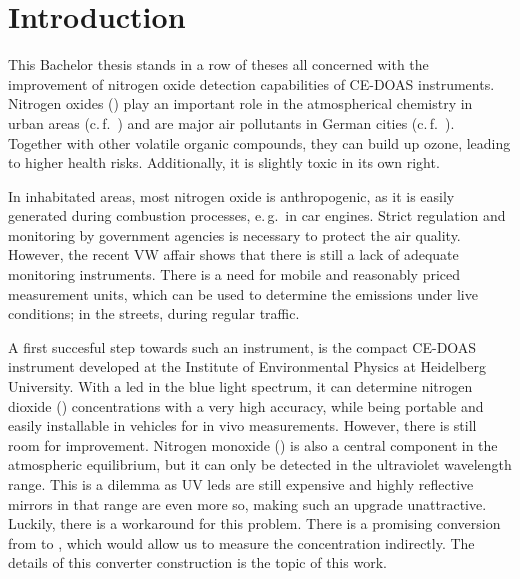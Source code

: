 \section{Introduction}
\label{sec:intro}

This Bachelor thesis stands in a row of theses all concerned with the
improvement of nitrogen oxide detection capabilities of CE-DOAS
instruments. Nitrogen oxides () play an important role in the
atmospherical chemistry in urban areas (c.\,f.~\cite{roedel}) and are
major air pollutants in German cities
(c.\,f.~\cite{no2schadstoff,who}). Together with other volatile
organic compounds, they can build up ozone, leading to higher health
risks. Additionally, it is slightly toxic in its own right.

In inhabitated areas, most nitrogen oxide is anthropogenic, as it is
easily generated during combustion processes, e.\,g.\ in car
engines. Strict regulation and monitoring by government agencies is
necessary to protect the air quality. However, the recent VW affair
shows that there is still a lack of adequate monitoring
instruments. There is a need for mobile and reasonably priced measurement
units, which can be used to determine the  emissions under
live conditions; in the streets, during regular traffic.

A first succesful step towards such an instrument, is the compact
CE-DOAS instrument developed at the Institute of Environmental Physics
at Heidelberg University. With a led in the blue light spectrum, it
can determine nitrogen dioxide () concentrations with a very
high accuracy, while being portable and easily installable in vehicles
for in vivo measurements. However, there is still room for
improvement. Nitrogen monoxide () is also a central component
in the atmospheric  equilibrium, but it can only be detected
in the ultraviolet wavelength range. This is a dilemma as UV leds are
still expensive and highly reflective mirrors in that range are even
more so, making such an upgrade unattractive. Luckily, there is a
workaround for this problem. There is a promising conversion from
 to , which would allow us to measure the concentration
indirectly. The details of this converter construction is the topic of
this work.

